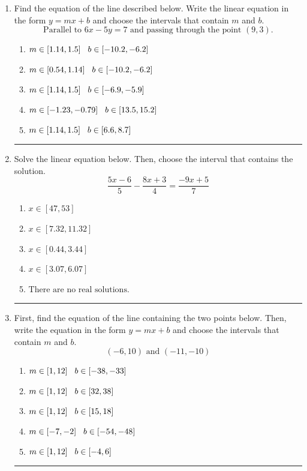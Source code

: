 \documentclass[14pt]{extbook}
\newcommand{\litem}[1]{\item#1\hspace*{-1cm}\rule{\textwidth}{0.4pt}}
\begin{document}
\begin{enumerate}
{\begin{enumerate}[label=\Alph*.]
\end{enumerate} }
\litem{
Find the equation of the line described below. Write the linear equation in the form $ y=mx+b $ and choose the intervals that contain $m$ and $b$.\[ \text{Parallel to } 6 x - 5 y = 7 \text{ and passing through the point } (9, 3). \]\begin{enumerate}[label=\Alph*.]
\item \( m \in [1.14, 1.5] \hspace*{3mm} b \in [-10.2, -6.2] \)
\item \( m \in [0.54, 1.14] \hspace*{3mm} b \in [-10.2, -6.2] \)
\item \( m \in [1.14, 1.5] \hspace*{3mm} b \in [-6.9, -5.9] \)
\item \( m \in [-1.23, -0.79] \hspace*{3mm} b \in [13.5, 15.2] \)
\item \( m \in [1.14, 1.5] \hspace*{3mm} b \in [6.6, 8.7] \)

\end{enumerate} }
\litem{
Solve the linear equation below. Then, choose the interval that contains the solution.\[ \frac{5x -6}{5} - \frac{8x + 3}{4} = \frac{-9x + 5}{7} \]\begin{enumerate}[label=\Alph*.]
\item \( x \in [47, 53] \)
\item \( x \in [7.32, 11.32] \)
\item \( x \in [0.44, 3.44] \)
\item \( x \in [3.07, 6.07] \)
\item \( \text{There are no real solutions.} \)

\end{enumerate} }
\litem{
First, find the equation of the line containing the two points below. Then, write the equation in the form $ y=mx+b $ and choose the intervals that contain $m$ and $b$.\[ (-6, 10) \text{ and } (-11, -10) \]\begin{enumerate}[label=\Alph*.]
\item \( m \in [1, 12] \hspace*{3mm} b \in [-38, -33] \)
\item \( m \in [1, 12] \hspace*{3mm} b \in [32, 38] \)
\item \( m \in [1, 12] \hspace*{3mm} b \in [15, 18] \)
\item \( m \in [-7, -2] \hspace*{3mm} b \in [-54, -48] \)
\item \( m \in [1, 12] \hspace*{3mm} b \in [-4, 6] \)


\end{enumerate}}
\end{enumerate}
\end{document}
